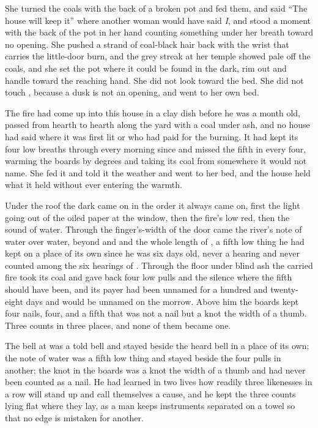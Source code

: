 She turned the coals with the back of a broken pot and fed them, and said “The house will keep it” where another woman would have said \emph{I}, and stood a moment with the back of the pot in her hand counting something under her breath toward no opening. She pushed a strand of coal-black hair back with the wrist that carries the little-door burn, and the grey streak at her temple showed pale off the coals, and she set the pot where it could be found in the dark, rim out and handle toward the reaching hand. She did not look toward the bed. She did not touch , because a dusk is not an opening, and went to her own bed.

The fire had come up into this house in a clay dish before he was a month old, passed from hearth to hearth along the yard with a coal under ash, and no house had said where it was first lit or who had paid for the burning. It had kept its four low breaths through every morning since and missed the fifth in every four, warming the boards by degrees and taking its coal from somewhere it would not name. She fed it and told it the weather and went to her bed, and the house held what it held without ever entering the warmth.

Under the roof the dark came on in the order it always came on, first the light going out of the oiled paper at the window, then the fire's low red, then the sound of water. Through the finger's-width of the door came the river's note of water over water, beyond  and  and the whole length of , a fifth low thing he had kept on a place of its own since he was six days old, never a hearing and never counted among the six hearings of . Through the floor under blind ash the carried fire took its coal and gave back four low pulls and the silence where the fifth should have been, and its payer had been unnamed for a hundred and twenty-eight days and would be unnamed on the morrow. Above him the boards kept four nails, four, and a fifth that was not a nail but a knot the width of a thumb. Three counts in three places, and none of them became one.

The bell at  was a told bell and stayed beside the heard bell in a place of its own; the note of water was a fifth low thing and stayed beside the four pulls in another; the knot in the boards was a knot the width of a thumb and had never been counted as a nail. He had learned in two lives how readily three likenesses in a row will stand up and call themselves a cause, and he kept the three counts lying flat where they lay, as a man keeps instruments separated on a towel so that no edge is mistaken for another.

